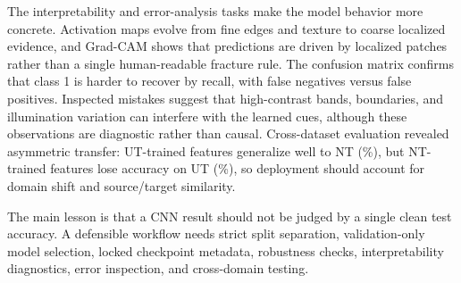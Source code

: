\documentclass[10pt,a4paper]{article}
\begin{document}
The interpretability and error-analysis tasks make the model behavior more concrete. Activation
maps evolve from fine edges and texture to coarse localized evidence, and Grad-CAM shows that
predictions are driven by localized patches rather than a single human-readable fracture rule.
The confusion matrix confirms that class 1 is harder to recover by recall, with
\TaskFourFalseNegatives{} false negatives versus \TaskFourFalsePositives{} false positives.
Inspected mistakes suggest that high-contrast bands, boundaries, and illumination variation can
interfere with the learned cues, although these observations are diagnostic rather than causal.
Cross-dataset evaluation revealed asymmetric transfer: UT-trained features generalize well to NT
(\TaskFiveUTNT\%), but NT-trained features lose accuracy on UT (\TaskFiveNTUT\%), so deployment
should account for domain shift and source/target similarity.

The main lesson is that a CNN result should not be judged by a single clean test accuracy. A
defensible workflow needs strict split separation, validation-only model selection, locked
checkpoint metadata, robustness checks, interpretability diagnostics, error inspection, and
cross-domain testing.

\clearpage
\end{document}
